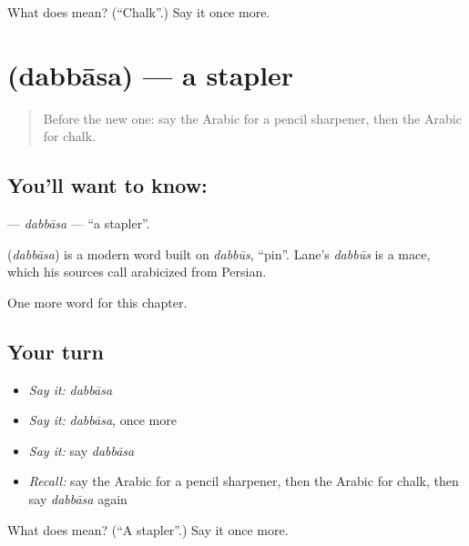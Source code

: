 \begin{tcolorbox}[breakable,colback=teal!4,colframe=teal!35!black,title={Before you move on}]
What does  mean? (\textquotedblleft{}Chalk\textquotedblright{}.) Say it once more.
\end{tcolorbox}
\section[\texorpdfstring{\ar{دباسة} (dabbāsa)}{دباسة (dabbāsa)}]{ (dabbāsa) — a stapler}

\label{lesson:AR-C253-dabbasa}



\begin{quote}
Before the new one: say the Arabic for a pencil sharpener, then the Arabic for chalk.
\end{quote}

\subsection*{You'll want to know: }
\textbf{} — \emph{dabbāsa} — \textquotedblleft{}a stapler\textquotedblright{}.

\begin{cousinweb}
\textbf{} (\emph{dabbāsa}) is a modern word built on \emph{dabbūs}, \textquotedblleft{}pin\textquotedblright{}. Lane's \emph{dabbūs} is a mace, which his sources call arabicized from Persian.
\end{cousinweb}

\begin{grammarlens}[title={What you've built}]
One more word for this chapter.
\end{grammarlens}

\subsection*{Your turn}
\begin{itemize}
\raggedright
  \item \emph{Say it:} \emph{dabbāsa}
  \item \emph{Say it:} \emph{dabbāsa}, once more
  \item \emph{Say it:} say \emph{dabbāsa}
  \item \emph{Recall:} say the Arabic for a pencil sharpener, then the Arabic for chalk, then say \emph{dabbāsa} again
\end{itemize}

\begin{tcolorbox}[breakable,colback=teal!4,colframe=teal!35!black,title={Before you move on}]
What does  mean? (\textquotedblleft{}A stapler\textquotedblright{}.) Say it once more.
\end{tcolorbox}
